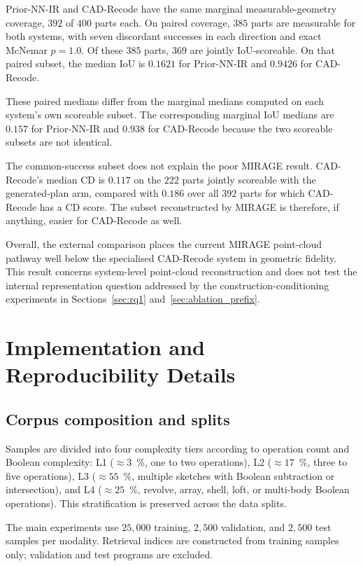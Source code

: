 \documentclass[preprint,12pt]{elsarticle}
\begin{document}
Prior-NN-IR and CAD-Recode have the same marginal measurable-geometry
coverage, $392$ of $400$ parts each. On paired coverage, $385$ parts are
measurable for both systems, with seven discordant successes in each direction
and exact McNemar $p=1.0$. Of these $385$ parts, $369$ are jointly
IoU-scoreable. On that paired subset, the median IoU is $0.1621$ for
Prior-NN-IR and $0.9426$ for CAD-Recode.

These paired medians differ from the marginal medians computed on each
system's own scoreable subset. The corresponding marginal IoU medians are
$0.157$ for Prior-NN-IR and $0.938$ for CAD-Recode because the two scoreable
subsets are not identical.

The common-success subset does not explain the poor MIRAGE result.
CAD-Recode's median CD is $0.117$ on the $222$ parts jointly scoreable with
the generated-plan arm, compared with $0.186$ over all $392$ parts for which
CAD-Recode has a CD score. The subset reconstructed by MIRAGE is therefore,
if anything, easier for CAD-Recode as well.

Overall, the external comparison places the current MIRAGE point-cloud
pathway well below the specialised CAD-Recode system in geometric fidelity.
This result concerns system-level point-cloud reconstruction and does not test
the internal representation question addressed by the construction-conditioning
experiments in Sections~\ref{sec:rq1} and~\ref{sec:ablation_prefix}.


\section{Implementation and Reproducibility Details}
\label{app:implementation}

\subsection{Corpus composition and splits}
\label{app:corpus}

Samples are divided into four complexity tiers according to operation count and
Boolean complexity: L1 ($\approx 3$~\%, one to two operations), L2
($\approx 17$~\%, three to five operations), L3 ($\approx 55$~\%, multiple
sketches with Boolean subtraction or intersection), and L4 ($\approx 25$~\%,
revolve, array, shell, loft, or multi-body Boolean operations). This
stratification is preserved across the data splits.

The main experiments use $25{,}000$ training, $2{,}500$ validation, and
$2{,}500$ test samples per modality. Retrieval indices are constructed from
training samples only; validation and test programs are excluded.
\end{document}
